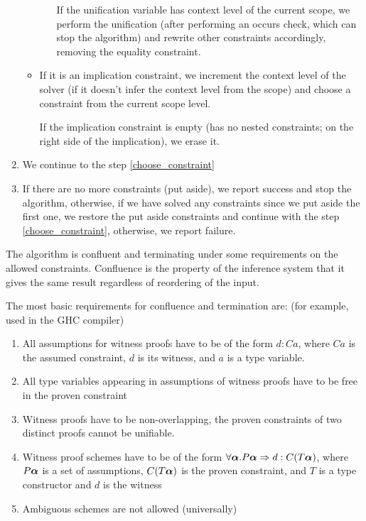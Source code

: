 \begin{enumerate}
\begin{itemize}
\begin{itemize}
            If the unification variable has context level of the current scope, we perform the unification (after performing an occurs check, which can stop the algorithm) and rewrite other constraints accordingly, removing the equality constraint.

        \end{itemize}

        \item If it is an implication constraint, we increment the context level of the solver (if it doesn't infer the context level from the scope) and choose a constraint from the current scope level.

        If the implication constraint is empty (has no nested constraints; on the right side of the implication), we erase it.
    \end{itemize}

    \item We continue to the step \ref{choose_constraint}

    \item \label{false_constraint} If there are no more constraints (put aside), we report success and stop the algorithm, otherwise, if we have solved any constraints since we put aside the first one, we restore the put aside constraints and continue with the step \ref{choose_constraint}, otherwise, we report failure.
\end{enumerate}

\begin{remark}\label{defer_properties}
    The algorithm is confluent and terminating  under some requirements on the allowed constraints. Confluence is the property of the inference system that it gives the same result regardless of reordering of the input.
\end{remark}

The most basic requirements for confluence and termination are: (for example, used in the GHC compiler)

\begin{enumerate}
    \item All assumptions for witness proofs have to be of the form $d : C a$, where $C a$ is the assumed constraint, $d$ is its witness, and $a$ is a type variable. \label{triv_assump}
    \item All type variables appearing in assumptions of witness proofs have to be free in the proven constraint \label{free_free}
    \item Witness proofs have to be non-overlapping, the proven constraints of two distinct proofs cannot be unifiable. \label{noover}
    \item Witness proof schemes have to be of the form $\forall \boldsymbol{\alpha} . P \boldsymbol{\alpha} \Rightarrow d : C (T \boldsymbol{\alpha})$, where $P \boldsymbol{\alpha}$ is a set of assumptions, $C (T \boldsymbol{\alpha})$ is the proven constraint, and $T$ is a type constructor and $d$ is the witness \label{lookup_t}
    \item Ambiguous schemes are not allowed (universally)
\end{enumerate}

